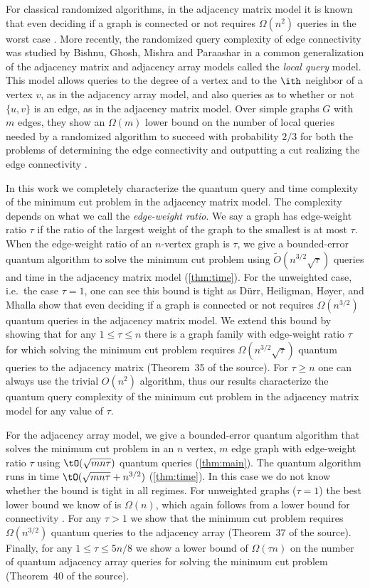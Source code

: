 For classical randomized algorithms, in the adjacency matrix model it is known that even deciding if a graph is connected or not requires $\Omega(n^2)$ queries in the worst case \cite{DHHM06}.
More recently, the randomized query complexity of edge connectivity was studied by Bishnu, Ghosh, Mishra and Paraashar \cite{BGMP20} in a common generalization of the adjacency matrix 
and adjacency array models called the \emph{local query} model.  This model allows queries to the degree of a vertex and to the $\ith$ neighbor of a vertex $v$, 
as in the adjacency array model, and also queries as to whether or not $\{u,v\}$ is an edge, as in the adjacency matrix model.  Over simple graphs $G$ with $m$ edges, they show an 
$\Omega(m)$ lower bound on the number of local queries needed by a randomized algorithm to succeed with probability $2/3$ for both the problems of determining the edge connectivity and 
outputting a cut realizing the edge connectivity \cite[Theorems 2 and 3]{BGMP20}.  

In this work we completely characterize the quantum query and time complexity of the minimum cut problem in the adjacency matrix model.  The complexity depends on what we call 
the \emph{edge-weight ratio}.  We say a graph has edge-weight ratio $\tau$ if the ratio of the largest weight of the graph to the smallest is at most $\tau$.
When the edge-weight ratio of an $n$-vertex graph is $\tau$, we give a bounded-error quantum algorithm to solve the minimum cut problem using $\tilde O(n^{3/2} \sqrt{\tau})$ queries and time 
in the adjacency matrix model (\cref{thm:time}).
For the unweighted case, i.e.\ the case $\tau = 1$, one can see this bound is tight as D\"{u}rr, Heiligman, H{\o}yer, and Mhalla \cite{DHHM06} show that even deciding if a graph is connected or not requires $\Omega(n^{3/2})$ quantum queries 
in the adjacency matrix model.  
We extend this bound by showing that for any $1 \le \tau \le n$ there is a graph family with edge-weight ratio $\tau$ for which solving the minimum cut problem requires $\Omega(n^{3/2} \sqrt{\tau})$ quantum queries to the adjacency matrix 
(Theorem~35 of the source).  For $\tau \ge n$ one can always use the trivial $O(n^2)$ algorithm, thus 
our results characterize the quantum query complexity of the minimum cut problem in the adjacency matrix model for any value of $\tau$.

For the adjacency array model, we give a bounded-error quantum algorithm that solves the minimum cut problem in an $n$ vertex, $m$ edge graph with edge-weight ratio $\tau$ using $\tO(\sqrt{mn\tau})$ quantum queries (\cref{thm:main}).
The quantum algorithm runs in time $\tO(\sqrt{mn\tau} + n^{3/2})$ (\cref{thm:time}).
In this case we do not know whether the bound is tight in all regimes.
For unweighted graphs ($\tau = 1$) the best lower bound we know of is $\Omega(n)$, which again follows from a lower bound for connectivity \cite{DHHM06}.
For any $\tau > 1$ we show that the minimum cut problem requires $\Omega(n^{3/2})$ quantum queries to the adjacency array (Theorem~37 of the source).
Finally, for any $1 \leq \tau \leq 5n/8$ we show a lower bound of $\Omega(\tau n)$ on the number of quantum adjacency array queries for solving the minimum cut problem (Theorem~40 of the source).

